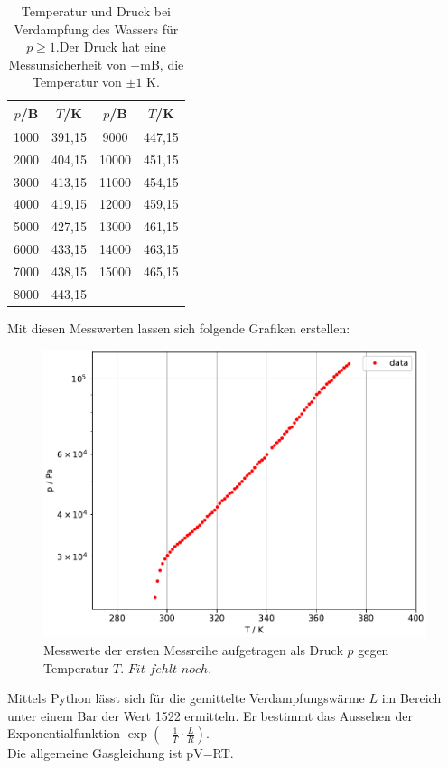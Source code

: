 \begin{table}
  \centering
  \caption{Temperatur und Druck bei Verdampfung des Wassers für $p\geq 1$.Der Druck hat eine Messunsicherheit von
  $\pm$mB, die Temperatur von $\pm 1$ K.}
  \label{tab:Messreihe_2}
\begin{tabular}{
  c c||c c
}
\toprule 
$p$/B & $T$/K & $p$/B & $T$/K\\
\midrule
1000  & 391,15 & 9000  & 447,15\\
2000  & 404,15 & 10000 & 451,15\\
3000  & 413,15 & 11000 & 454,15\\
4000  & 419,15 & 12000 & 459,15\\
5000  & 427,15 & 13000 & 461,15\\
6000  & 433,15 & 14000 & 463,15\\
7000  & 438,15 & 15000 & 465,15\\
8000  & 443,15 &       &       \\
\bottomrule
\end{tabular}
\end{table}

Mit diesen Messwerten lassen sich folgende Grafiken erstellen:
\begin{figure}
  \centering
  \includegraphics[width=\textwidth]{plot_simon1.pdf}
  \caption{Messwerte der ersten Messreihe aufgetragen als Druck $p$ 
  gegen Temperatur $T$. $Fit\,\,fehlt\,\, noch$.}
\end{figure}
Mittels Python lässt sich für die gemittelte Verdampfungswärme $L$ im Bereich unter einem Bar der Wert
1522 ermitteln. Er bestimmt das Aussehen der Exponentialfunktion $\exp(-\frac{1}{T}\cdot\frac{L}{R})$.
\\
Die allgemeine Gasgleichung ist pV=RT. 
\newpage
